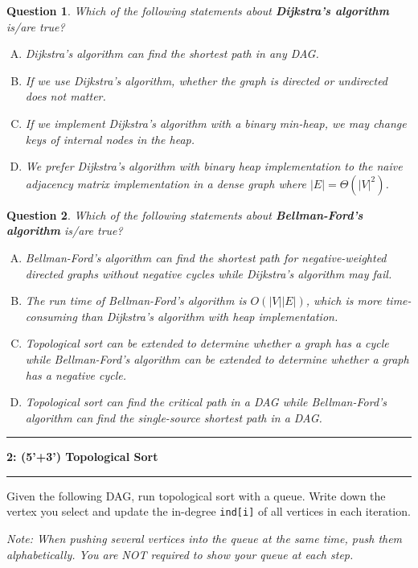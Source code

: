 \documentclass[10.5pt]{article}
\newcommand\question[2]{\vspace{.25in}\hrule\textbf{#1: #2}\vspace{.5em}\hrule\vspace{.10in}}
\newtheorem{Q}{Question}
\begin{document}
	\begin{Q}
		Which of the following statements about \textbf{Dijkstra’s algorithm} is/are true?
		\begin{enumerate}[(A)]
			\item Dijkstra’s algorithm can find the shortest path in any DAG.
			\item If we use Dijkstra’s algorithm, whether the graph is directed or undirected does not matter.
			\item If we implement Dijkstra’s algorithm with a binary min-heap, we may change keys of internal nodes in the heap.
			\item We prefer Dijkstra’s algorithm with binary heap implementation to the naive adjacency matrix implementation in a dense graph where $|E| = \Theta(|V|^2)$.
		\end{enumerate}
	\end{Q}
	\vspace{0.5cm}

	\begin{Q}
		Which of the following statements about \textbf{Bellman-Ford's algorithm} is/are true?
		\begin{enumerate}[(A)]
			\item Bellman-Ford's algorithm can find the shortest path for negative-weighted directed graphs without negative cycles while Dijkstra’s algorithm may fail.
			\item The run time of Bellman-Ford's algorithm is $O(|V||E|)$, which is more time-consuming than Dijkstra’s algorithm with heap implementation.
			\item Topological sort can be extended to determine whether a graph has a cycle while Bellman-Ford's algorithm can be extended to determine whether a graph has a negative cycle.
			\item Topological sort can find the critical path in a DAG while Bellman-Ford's algorithm can find the single-source shortest path in a DAG.
		\end{enumerate}
	\end{Q}
	\vspace{0.5cm}

\pagebreak

\question{2}{(5'+3') Topological Sort}


	Given the following DAG, run topological sort with a queue. Write down the vertex you select and update the in-degree \texttt{ind[i]} of all vertices in each iteration.  
	
	\textit{Note: When pushing several vertices into the queue at the same time, push them alphabetically. You are NOT required to show your queue at each step.}
	
\end{document}
